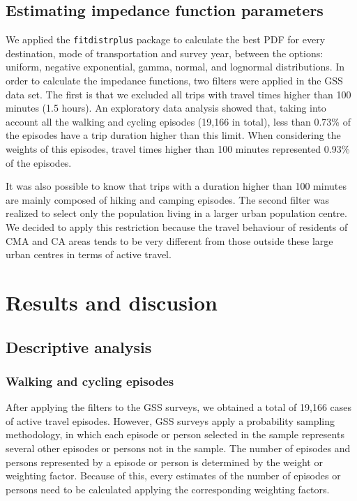 \documentclass[preprint, 3p,
authoryear]{elsarticle} %
\begin{document}
\subsection{Estimating impedance function
parameters}\label{estimating-impedance-function-parameters}

We applied the \texttt{fitdistrplus} package
\citep{delignette2015fitdistrplus} to calculate the best PDF for every
destination, mode of transportation and survey year, between the
options: uniform, negative exponential, gamma, normal, and lognormal
distributions. In order to calculate the impedance functions, two
filters were applied in the GSS data set. The first is that we excluded
all trips with travel times higher than 100 minutes (1.5 hours). An
exploratory data analysis showed that, taking into account all the
walking and cycling episodes (19,166 in total), less than 0.73\% of the
episodes have a trip duration higher than this limit. When considering
the weights of this episodes, travel times higher than 100 minutes
represented 0.93\% of the episodes.

It was also possible to know that trips with a duration higher than 100
minutes are mainly composed of hiking and camping episodes. The second
filter was realized to select only the population living in a larger
urban population centre. We decided to apply this restriction because
the travel behaviour of residents of CMA and CA areas tends to be very
different from those outside these large urban centres in terms of
active travel.

\section{Results and discusion}\label{results-and-discusion}

\subsection{Descriptive analysis}\label{descriptive-analysis}

\subsubsection{Walking and cycling
episodes}\label{walking-and-cycling-episodes}

After applying the filters to the GSS surveys, we obtained a total of
19,166 cases of active travel episodes. However, GSS surveys apply a
probability sampling methodology, in which each episode or person
selected in the sample represents several other episodes or persons not
in the sample. The number of episodes and persons represented by a
episode or person is determined by the weight or weighting factor.
Because of this, every estimates of the number of episodes or persons
need to be calculated applying the corresponding weighting factors.
\end{document}
